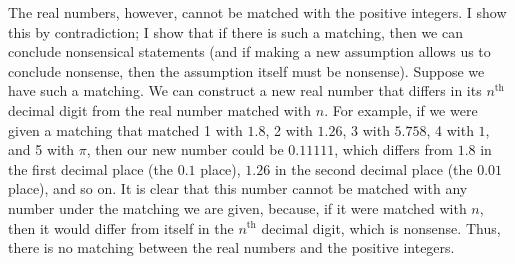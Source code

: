 \documentclass[letterpaper,11pt,showproblems]{pset}
\theoremstyle{definition} \newtheorem{defn}{Definition}[section]
\theoremstyle{definition} \newtheorem*{defn*}{Definition}
\begin{document}
  The real numbers, however, cannot be matched with the positive integers.  I show this by contradiction; I show that if there is such a matching, then we can conclude nonsensical statements (and if making a new assumption allows us to conclude nonsense, then the assumption itself must be nonsense).  Suppose we have such a matching.  We can construct a new real number that differs in its $n^\text{th}$ decimal digit from the real number matched with $n$.  For example, if we were given a matching that matched 1 with $1.8$, 2 with $1.26$, 3 with $5.758$, 4 with $1$, and 5 with $\pi$, then our new number could be $0.11111$, which differs from $1.8$ in the first decimal place (the $0.1$ place), $1.26$ in the second decimal place (the $0.01$ place), and so on.  It is clear that this number cannot be matched with any number under the matching we are given, because, if it were matched with $n$, then it would differ from itself in the $n^\text{th}$ decimal digit, which is nonsense.  Thus, there is no matching between the real numbers and the positive integers.

\clearpage
\end{document}
